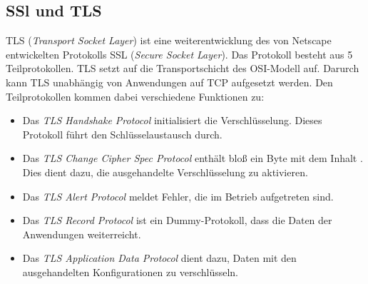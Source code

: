 \documentclass[a4paper,landscape]{article}
\begin{document}
\begin{multicols*}{4}
	\subsection{SSl und TLS}
	TLS (\emph{Transport Socket Layer}) ist eine weiterentwicklung des von
	Netscape entwickelten Protokolls SSL (\emph{Secure Socket Layer}).
	Das Protokoll besteht aus 5 Teilprotokollen. TLS setzt auf die
	Transportschicht des OSI-Modell auf. Darurch kann TLS unabhängig von
	Anwendungen auf TCP aufgesetzt werden.  Den Teilprotokollen kommen dabei
	verschiedene Funktionen zu:
	\begin{itemize}
		\item Das \emph{TLS Handshake Protocol} initialisiert die
		      Verschlüsselung. Dieses Protokoll führt den Schlüsselaustausch
		      durch.
		\item Das \emph{TLS Change Cipher Spec Protocol} enthält bloß ein Byte
		      mit dem Inhalt \grqq. Dies dient dazu, die ausgehandelte
		      Verschlüsselung zu aktivieren.
		\item Das \emph{TLS Alert Protocol} meldet Fehler, die im Betrieb
		      aufgetreten sind.
		\item Das \emph{TLS Record Protocol} ist ein Dummy-Protokoll, dass die
		      Daten der Anwendungen weiterreicht.
		\item Das \emph{TLS Application Data Protocol} dient dazu, Daten mit den
		      ausgehandelten Konfigurationen zu verschlüsseln.
	\end{itemize}

\end{multicols*}
\end{document}

